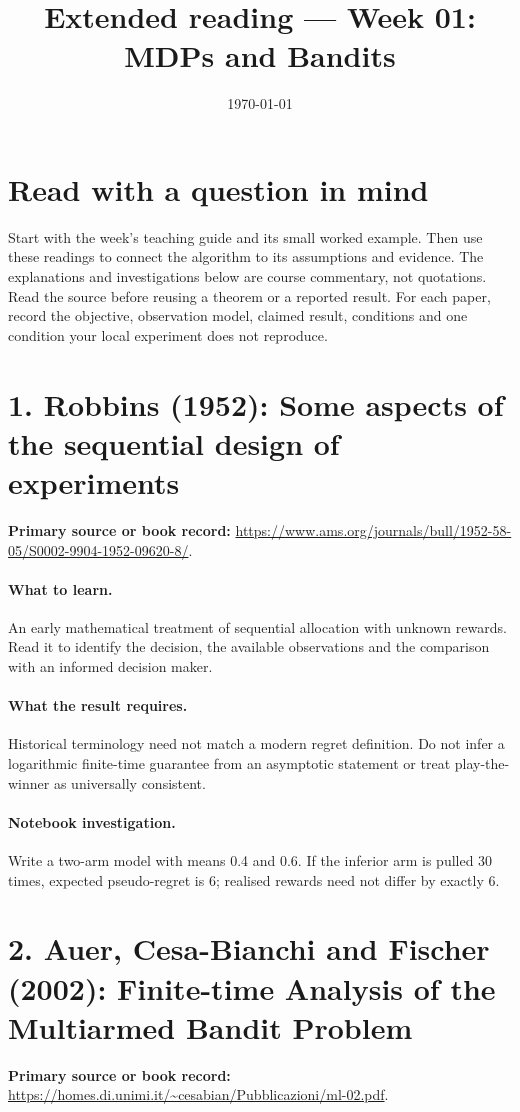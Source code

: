 \documentclass[11pt]{scrartcl}
\title{Extended reading --- Week 01: MDPs and Bandits}
\date{\today}
\begin{document}
\maketitle
\section*{Read with a question in mind}
Start with the week's teaching guide and its small worked example. Then use
these readings to connect the algorithm to its assumptions and evidence.
The explanations and investigations below are course commentary, not
quotations. Read the source before reusing a theorem or a reported result.
For each paper, record the objective, observation model, claimed result,
conditions and one condition your local experiment does not reproduce.

\section*{1. Robbins (1952): Some aspects of the sequential design of experiments}
\textbf{Primary source or book record:} \url{https://www.ams.org/journals/bull/1952-58-05/S0002-9904-1952-09620-8/}.

\paragraph{What to learn.} An early mathematical treatment of sequential allocation with unknown rewards. Read it to identify the decision, the available observations and the comparison with an informed decision maker.

\paragraph{What the result requires.} Historical terminology need not match a modern regret definition. Do not infer a logarithmic finite-time guarantee from an asymptotic statement or treat play-the-winner as universally consistent.

\paragraph{Notebook investigation.} Write a two-arm model with means 0.4 and 0.6. If the inferior arm is pulled 30 times, expected pseudo-regret is 6; realised rewards need not differ by exactly 6.

\section*{2. Auer, Cesa-Bianchi and Fischer (2002): Finite-time Analysis of the Multiarmed Bandit Problem}
\textbf{Primary source or book record:} \url{https://homes.di.unimi.it/~cesabian/Pubblicazioni/ml-02.pdf}.
\end{document}
